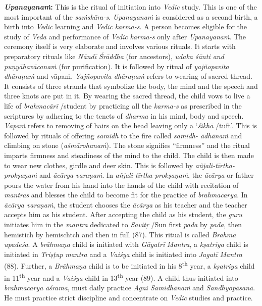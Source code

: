 \begin{enumerate}
  \textbf{\emph{Upanayanaṁ}:} This is the ritual of initiation into \emph{Vedic} study. This is one of the most important of the \emph{saṁskāra-s}. \emph{Upanayanaṁ} is considered as a second birth, a birth into \emph{Vedic} learning and \emph{Vedic} \emph{karma-s}. A person becomes eligible for the study of \emph{Veda} and performance of \emph{Vedic} \emph{karma-s} only after \emph{Upanayanaṁ}. The ceremony itself is very elaborate and involves various rituals. It starts with preparatory rituals like \emph{Nāndī Śrāddha} (for ancestors), \emph{udaka śānti and puṇyāhavācanaṁ} (for purification). It is followed by ritual of \emph{yajñopavita dhāraṇaṁ} and vāpaṁ. \emph{Yajñopavita dhāraṇaṁ} refers to wearing of sacred thread. It consists of three strands that symbolize the body, the mind and the speech and three knots are put in it. By wearing the sacred thread, the child vows to live a life of \emph{brahmacārī} /student by practicing all the \emph{karma-s} as prescribed in the scriptures by adhering to the tenets of \emph{dharma} in his mind, body and speech. \emph{Vāpaṁ} refers to removing of hairs on the head leaving only a `\emph{śikhā} /tuft'. This is followed by rituals of offering \emph{samidh} to the fire called \emph{samidh- ādhānaṁ} and climbing on stone (\emph{aśmārohanaṁ}). The stone signifies ``firmness'' and the ritual imparts firmness and steadiness of the mind to the child. The child is then made to wear new clothes, girdle and deer skin. This is followed by \emph{añjali-tīrtha-prokṣaṇaṁ} and \emph{ācārya varaṇaṁ}. In \emph{añjali-tīrtha-prokṣaṇaṁ}, the \emph{ācārya} or father pours the water from his hand into the hands of the child with recitation of \emph{mantras} and blesses the child to become fit for the practice of \emph{brahmacarya}. In \emph{ācārya varaṇaṁ}, the student chooses the \emph{ācārya} as his teacher and the teacher accepts him as his student. After accepting the child as his student, the \emph{guru} initiates him in the \emph{mantra} dedicated to \emph{Savitṛ} /Sun first \emph{pada} by \emph{pada}, then hemistich by hemischtch and then in full (87). This ritual is called \emph{Brahma upadeśa}. A \emph{brāhmaṇa} child is initiated with \emph{Gāyatrī} \emph{Mantra}, a \emph{kṣatriya} child is initiated in \emph{Triṣṭup} \emph{mantra} and a \emph{Vaiśya} child is initiated into \emph{Jagatī} \emph{Mantra} (88). Further, a \emph{Brāhmaṇa} child is to be initiated in his 8\textsuperscript{th} year, a \emph{kṣatriya} child in 11\textsuperscript{th} year and a \emph{Vaiśya} child in 13\textsuperscript{th} year (89). A child thus initiated into \emph{brahmacarya} \emph{āśrama}, must daily practice \emph{Agni Samidhānaṁ} and \emph{Sandhyopāsanā}. He must practice strict discipline and concentrate on \emph{Vedic} studies and practice.

\end{enumerate}
